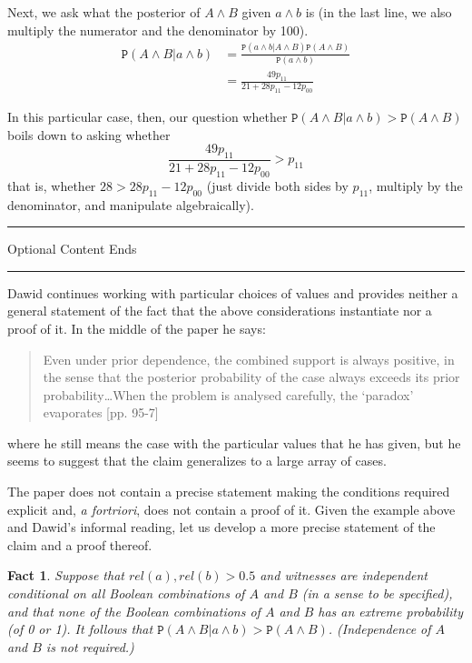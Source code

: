 \documentclass{ifcolog}
\newcommand{\intermezzob}{\nopagebreak 
	\begin{minipage}[c]{13cm}
	\begin{center}\rule{10cm}{0.4pt}

	\tiny{\sc Optional Content Ends}
	
	\vspace{-1mm}
	
	\rule{10cm}{0.4pt}\end{center}
	\end{minipage}
	}
\newcommand{\pr}[1]{\mbox{$\mathtt{P}(#1)$}}
\newcommand{\et}{\wedge}
\newtheorem{fact}{Fact}
\begin{document}
 Next, we ask what the posterior of $A\et B$ given $a\et b$ is (in the last line, we also multiply the numerator and the denominator by 100).
 \begin{align*}
 \pr{A\et B\vert a \et b} & =
         \frac{\pr{a\et b \vert A \et B}\pr{A\et B}}
             {\pr{a\et b}}\\
         & =
                     \frac{49p_{11}}
                           {21+28p_{11}-12p_{00}} 
         \end{align*}

 In this particular case, then, our question whether $\pr{A\et B\vert a\et b}>\pr{A\et B}$ boils down to asking whether
 \[\frac{49p_{11}}{21+28p_{11}-12p_{00}}> p_{11}\]
 that is, whether $28 > 28 p_{11}-12p_{00}$ (just divide both sides by $p_{11}$, multiply by the denominator, and manipulate algebraically). 

\intermezzob



 Dawid continues working with particular choices of values and provides neither a general statement of the fact that the above considerations instantiate nor a proof of it. In the middle of the paper he says: 
 \begin{quote}
 Even under prior dependence, the combined support is always positive, in the sense that the posterior probability of the case always exceeds its prior probability\dots When the problem is analysed carefully, the `paradox' evaporates [pp. 95-7]\end{quote}
 \noindent where he  still means the case with the particular values that he has given, but he seems to suggest that the claim generalizes to a large array of cases. 


 The paper does not contain a precise statement making the conditions required explicit and, \emph{a fortriori}, does not contain a proof of it.
Given the example above and Dawid's informal reading, let us develop a more precise statement of the claim and  a proof thereof. 


\begin{fact}\label{ther:increase}
Suppose that  $rel(a),rel(b)>0.5$ and witnesses are independent conditional on all Boolean combinations of $A$ and $B$  (in a sense to be specified), and that none of the Boolean combinations of $A$ and $B$ has an extreme probability (of 0 or 1). It follows that  $\pr{A\et B \vert a\et b}>\pr{A\et B}$. (Independence of $A$ and $B$ is not required.)
\end{fact}
\end{document}

